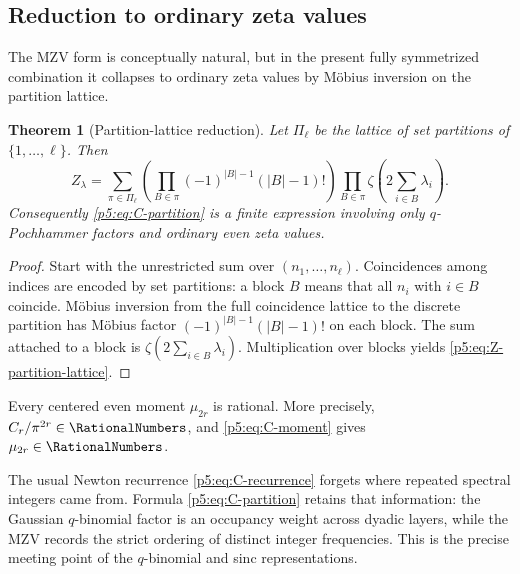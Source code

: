 \documentclass[11pt]{article}
\numberwithin{equation}{section}
\newtheorem{theorem}{Theorem}[section]
\theoremstyle{definition}
\theoremstyle{remark}
\begin{document}
\subsection{Reduction to ordinary zeta values}

The MZV form is conceptually natural, but in the present fully symmetrized
combination it collapses to ordinary zeta values by M\"obius inversion on the
partition lattice.

\begin{theorem}[Partition-lattice reduction]\label{p5:thm:partition-lattice}
Let $\Pi_\ell$ be the lattice of set partitions of $\{1,\dots,\ell\}$.  Then
\begin{equation}\label{p5:eq:Z-partition-lattice}
 \boxed{
 Z_\lambda=
 \sum_{\pi\in\Pi_\ell}
 \left(\prod_{B\in\pi}(-1)^{|B|-1}(|B|-1)!\right)
 \prod_{B\in\pi}
 \zeta\!\left(2\sum_{i\in B}\lambda_i\right).}
\end{equation}
Consequently \cref{p5:eq:C-partition} is a finite expression involving only
$q$-Pochhammer factors and ordinary even zeta values.
\end{theorem}

\begin{proof}
Start with the unrestricted sum over $(n_1,\dots,n_\ell)$.  Coincidences among
indices are encoded by set partitions: a block $B$ means that all $n_i$ with
$i\in B$ coincide.  M\"obius inversion from the full coincidence lattice to
the discrete partition has M\"obius factor
$(-1)^{|B|-1}(|B|-1)!$ on each block.  The sum attached to a block is
$\zeta(2\sum_{i\in B}\lambda_i)$.  Multiplication over blocks yields
\cref{p5:eq:Z-partition-lattice}.
\end{proof}

\begin{corollary}\label{p5:cor:q-mzv-rational}
Every centered even moment $\mu_{2r}$ is rational.  More precisely,
$C_r/\pi^{2r}\in\RationalNumbers$, and \cref{p5:eq:C-moment} gives $\mu_{2r}\in\RationalNumbers$.
\end{corollary}

\begin{remark}
The usual Newton recurrence \cref{p5:eq:C-recurrence} forgets where repeated
spectral integers came from.  Formula \cref{p5:eq:C-partition} retains that
information: the Gaussian $q$-binomial factor is an occupancy weight across
dyadic layers, while the MZV records the strict ordering of distinct integer
frequencies.  This is the precise meeting point of the $q$-binomial and sinc
representations.
\end{remark}
\end{document}
